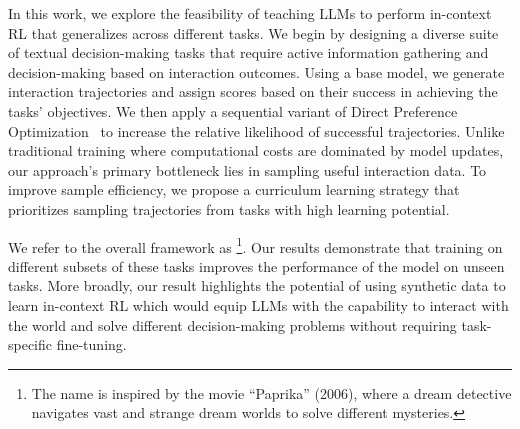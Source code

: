 In this work, we explore the feasibility of teaching LLMs to perform in-context RL that generalizes across different tasks. 
We begin by designing a diverse suite of textual decision-making tasks that require active information gathering and decision-making based on interaction outcomes.
Using a base model, we generate interaction trajectories and assign scores based on their success in achieving the tasks' objectives.
We then apply a sequential variant of Direct Preference Optimization~\citep[DPO]{rafailov2024direct} to increase the relative likelihood of successful trajectories.
Unlike traditional training where computational costs are dominated by model updates, our approach's primary bottleneck lies in sampling useful interaction data. To improve sample efficiency, we propose a curriculum learning strategy that prioritizes sampling trajectories from tasks with high learning potential.

We refer to the overall framework as \ours{}\footnote{The name is inspired by the movie ``Paprika'' (2006), where a dream detective navigates vast and strange dream worlds to solve different mysteries.}.
Our results demonstrate that training on different subsets of these tasks improves the performance of the model on unseen tasks. More broadly, our result highlights the potential of using synthetic data to learn in-context RL which would equip LLMs with the capability to interact with the world and solve different decision-making problems without requiring task-specific fine-tuning.

